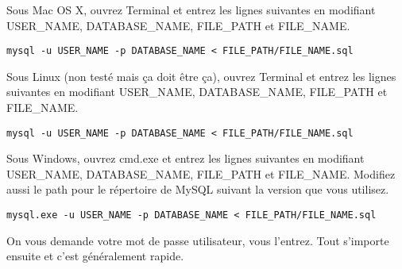 \documentclass{MyReportClass}
\begin{document}
Sous Mac OS X, ouvrez Terminal et entrez les lignes suivantes en modifiant USER\_NAME, DATABASE\_NAME, FILE\_PATH et FILE\_NAME.
\begin{lstlisting}
mysql -u USER_NAME -p DATABASE_NAME < FILE_PATH/FILE_NAME.sql
\end{lstlisting}

Sous Linux (non testé mais ça doit être ça), ouvrez Terminal et entrez les lignes suivantes en modifiant USER\_NAME, DATABASE\_NAME, FILE\_PATH et FILE\_NAME.
\begin{lstlisting}
mysql -u USER_NAME -p DATABASE_NAME < FILE_PATH/FILE_NAME.sql
\end{lstlisting}

Sous Windows, ouvrez cmd.exe et entrez les lignes suivantes en modifiant USER\_NAME, DATABASE\_NAME, FILE\_PATH et FILE\_NAME. Modifiez aussi le path pour le répertoire de MySQL suivant la version que vous utilisez.
\begin{lstlisting}
mysql.exe -u USER_NAME -p DATABASE_NAME < FILE_PATH/FILE_NAME.sql
\end{lstlisting}

On vous demande votre mot de passe utilisateur, vous l'entrez. Tout s'importe ensuite et c'est généralement rapide.
\end{document}
